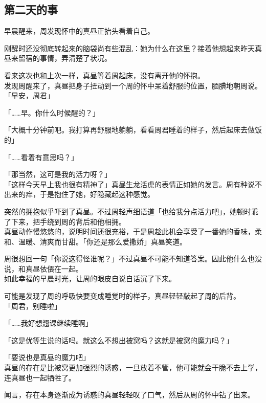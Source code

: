 \subsection{第二天的事}

早晨醒来，周发现怀中的真昼正抬头看着自己。

刚醒时还没彻底转起来的脑袋尚有些混乱：她为什么在这里？接着他想起来昨天真昼来留宿的事情，弄清楚了状况。

看来这次也和上次一样，真昼等着周起床，没有离开他的怀抱。\\

发现周醒来了，真昼把身子扭动到一个周的怀中呆着舒服的位置，腼腆地朝周说。\\

「早安，周君」

「……早。你什么时候醒的？」

「大概十分钟前吧。我打算再舒服地躺躺，看看周君睡着的样子，然后起床去做饭的」

「……看着有意思吗？」

「那当然，这可是我的活力呀？」\\

「这样今天早上我也很有精神了」真昼生龙活虎的表情正如她的发言。周有种说不出来的痒，于是抱住了她，好隐藏起这种感觉。

突然的拥抱似乎吓到了真昼。不过周轻声细语道「也给我分点活力吧」，她顿时乖了下来，把手绕到周的背后和他相拥。\\

真昼动作慢悠悠的，说明时间还很充裕，于是周趁此机会享受了一番她的香味，柔和、温暖、清爽而甘甜。「你还是那么爱撒娇」真昼笑道。

周很想回一句「你说这得怪谁呢？」不过真昼不可能不知道答案。因此他什么也没说，和真昼依偎在一起。\\

如此幸福的早晨时光，让周的眼皮自说自话沉了下来。

可能是发现了周的呼吸快要变成睡觉时的样子，真昼轻轻敲起了周的后背。\\

「周君，别睡啦」

「……我好想翘课继续睡啊」

「这是优等生说的话吗。就这么不想出被窝吗？这就是被窝的魔力吗？」

「要说也是真昼的魔力吧」\\

真昼的存在是比被窝更加强烈的诱惑，一旦放着不管，他可能就会干脆不去上学，连真昼也一起牺牲了。

闻言，存在本身逐渐成为诱惑的真昼轻轻叹了口气，然后从周的怀中钻了出来。\\

